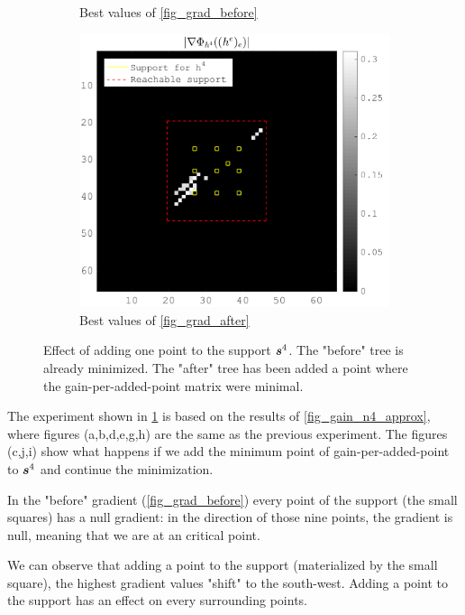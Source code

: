 \begin{figure}[!ht]
\begin{subfigure}[b]{0.32\textwidth}
\caption{Best values of \ref{fig_grad_before}}
\end{subfigure}
\begin{subfigure}[b]{0.32\textwidth}\centering
\includegraphics[width=\textwidth]{figures/before_after/xp_128x128_sc2_angl1_K3_S3_node4after_partgrad4_bestvalues.png}
\caption{Best values of \ref{fig_grad_after}}
\end{subfigure}
\caption{Effect of adding one point to the support $\bm{s}^4$. The "before" tree is already minimized. The "after" tree has been added a point where the gain-per-added-point matrix were minimal.} \label{fig_before_after_adding}
\end{figure}

The experiment shown in \cref{fig_before_after_adding} is based on the results of \cref{fig_gain_n4_approx}, where figures (a,b,d,e,g,h) are the same as the previous experiment. The figures (c,j,i) show what  happens if we add the minimum point of gain-per-added-point to $\bm{s}^4$ and continue the minimization.

In the "before" gradient (\cref{fig_grad_before}) every point of the support (the small squares) has a null gradient: in the direction of those nine points, the gradient is null, meaning that we are at an critical point.

We can observe that adding a point to the support (materialized by the  small square), the highest gradient values "shift" to the south-west. Adding a point to the support has an effect on every surrounding points.


